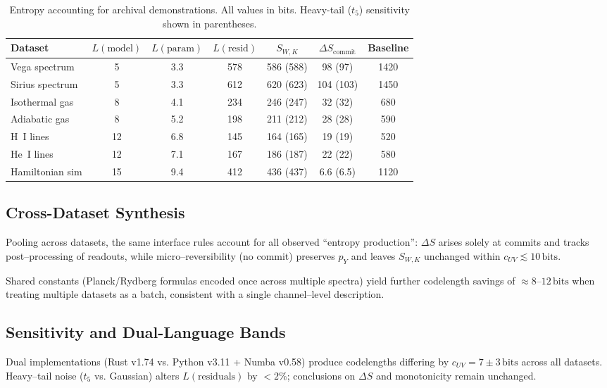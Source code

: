 \documentclass[11pt,letterpaper]{article}
\theoremstyle{definition}
\theoremstyle{remark}
\begin{document}
\begin{table}[ht]
\centering
\caption{Entropy accounting for archival demonstrations. All values in bits. Heavy-tail (\(t_5\)) sensitivity shown in parentheses.}
\label{tab:results}
\begin{tabular}{@{}lcccccc@{}}
\toprule
Dataset & \(L(\text{model})\) & \(L(\text{param})\) & \(L(\text{resid})\) & \(S_{W,K}\) & \(\Delta S_{\text{commit}}\) & Baseline \\
\midrule
Vega spectrum & 5 & 3.3 & 578 & 586 (588) & 98 (97) & 1420 \\
Sirius spectrum & 5 & 3.3 & 612 & 620 (623) & 104 (103) & 1450 \\
Isothermal gas & 8 & 4.1 & 234 & 246 (247) & 32 (32) & 680 \\
Adiabatic gas & 8 & 5.2 & 198 & 211 (212) & 28 (28) & 590 \\
H~I lines & 12 & 6.8 & 145 & 164 (165) & 19 (19) & 520 \\
He~I lines & 12 & 7.1 & 167 & 186 (187) & 22 (22) & 580 \\
Hamiltonian sim & 15 & 9.4 & 412 & 436 (437) & 6.6 (6.5) & 1120 \\
\bottomrule
\end{tabular}
\end{table}

\subsection{Cross-Dataset Synthesis}

Pooling across datasets, the same interface rules account for all observed ``entropy production'': \(\Delta S\) arises solely at commits and tracks post--processing of readouts, while micro--reversibility (no commit) preserves \(p_Y\) and leaves \(S_{W,K}\) unchanged within \(c_{UV}\lesssim 10\,\text{bits}\). 

Shared constants (Planck/Rydberg formulas encoded once across multiple spectra) yield further codelength savings of \(\approx 8\)--\(12\,\text{bits}\) when treating multiple datasets as a batch, consistent with a single channel--level description.

\subsection{Sensitivity and Dual-Language Bands}

Dual implementations (Rust v1.74 vs. Python v3.11 + Numba v0.58) produce codelengths differing by \(c_{UV} = 7\pm 3\,\text{bits}\) across all datasets. Heavy--tail noise (\(t_5\) vs. Gaussian) alters \(L(\text{residuals})\) by \(<2\%\); conclusions on \(\Delta S\) and monotonicity remain unchanged.
\end{document}

